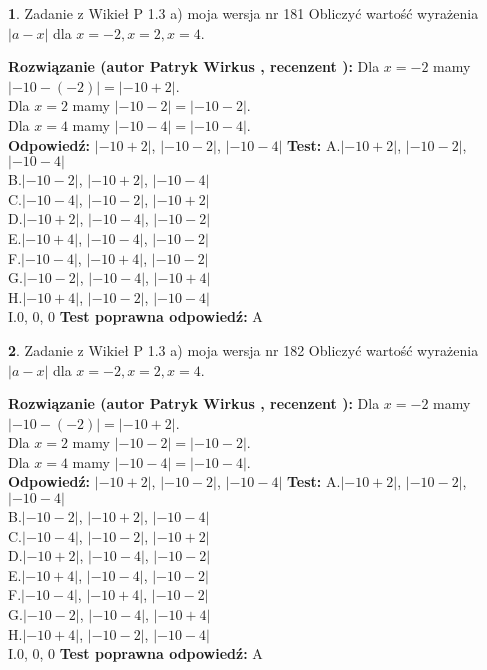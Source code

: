 \documentclass[12pt, a4paper]{article}
\theoremstyle{definition} %
\newtheorem{zad}{}
\newcommand{\zadStart}[1]{\begin{zad}#1\newline}
\newcommand{\zadStop}{\end{zad}}
\newcommand{\rozwStart}[2]{\noindent \textbf{Rozwiązanie (autor #1 , recenzent #2): }\newline}
\newcommand{\rozwStop}{\newline}
\newcommand{\odpStart}{\noindent \textbf{Odpowiedź:}\newline}
\newcommand{\odpStop}{\newline}
\newcommand{\testStart}{\noindent \textbf{Test:}\newline}
\newcommand{\testStop}{\newline}
\newcommand{\kluczStart}{\noindent \textbf{Test poprawna odpowiedź:}\newline}
\newcommand{\kluczStop}{\newline}
\begin{document}
\zadStart{Zadanie z Wikieł P 1.3 a) moja wersja nr 181}
Obliczyć wartość wyrażenia $|a - x|$ dla $x=-2,x=2,x=4$.
\zadStop
\rozwStart{Patryk Wirkus}{}
Dla $x = -2$ mamy $|-10 - (-2)| = |-10 + 2|$.\\
Dla $x = 2$ mamy $|-10 - 2| = |-10 - 2|$.\\
Dla $x = 4$ mamy $|-10 - 4| = |-10 - 4|$.\\
\rozwStop
\odpStart
$|-10 + 2|$, $|-10 - 2|$, $|-10 - 4|$
\odpStop
\testStart
A.$|-10 + 2|$, $|-10 - 2|$, $|-10 - 4|$\\
B.$|-10 - 2|$, $|-10 + 2|$, $|-10 - 4|$\\
C.$|-10 - 4|$, $|-10 - 2|$, $|-10 + 2|$\\
D.$|-10 + 2|$, $|-10 - 4|$, $|-10 - 2|$\\
E.$|-10 + 4|$, $|-10 - 4|$, $|-10 - 2|$\\
F.$|-10 - 4|$, $|-10 + 4|$, $|-10 - 2|$\\
G.$|-10 - 2|$, $|-10 - 4|$, $|-10 + 4|$\\
H.$|-10 + 4|$, $|-10 - 2|$, $|-10 - 4|$\\
I.$0$, $0$, $0$
\testStop
\kluczStart
A
\kluczStop



\zadStart{Zadanie z Wikieł P 1.3 a) moja wersja nr 182}
Obliczyć wartość wyrażenia $|a - x|$ dla $x=-2,x=2,x=4$.
\zadStop
\rozwStart{Patryk Wirkus}{}
Dla $x = -2$ mamy $|-10 - (-2)| = |-10 + 2|$.\\
Dla $x = 2$ mamy $|-10 - 2| = |-10 - 2|$.\\
Dla $x = 4$ mamy $|-10 - 4| = |-10 - 4|$.\\
\rozwStop
\odpStart
$|-10 + 2|$, $|-10 - 2|$, $|-10 - 4|$
\odpStop
\testStart
A.$|-10 + 2|$, $|-10 - 2|$, $|-10 - 4|$\\
B.$|-10 - 2|$, $|-10 + 2|$, $|-10 - 4|$\\
C.$|-10 - 4|$, $|-10 - 2|$, $|-10 + 2|$\\
D.$|-10 + 2|$, $|-10 - 4|$, $|-10 - 2|$\\
E.$|-10 + 4|$, $|-10 - 4|$, $|-10 - 2|$\\
F.$|-10 - 4|$, $|-10 + 4|$, $|-10 - 2|$\\
G.$|-10 - 2|$, $|-10 - 4|$, $|-10 + 4|$\\
H.$|-10 + 4|$, $|-10 - 2|$, $|-10 - 4|$\\
I.$0$, $0$, $0$
\testStop
\kluczStart
A
\kluczStop
\end{document}
